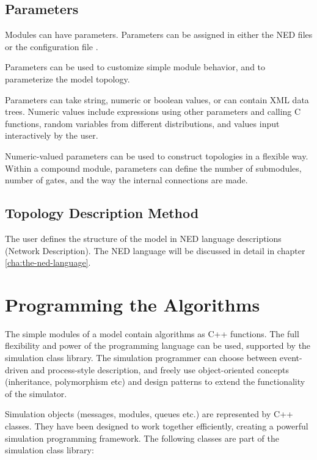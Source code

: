 \subsection{Parameters}

Modules can have parameters. Parameters can be assigned  in either
the NED files or the configuration file .

Parameters can be used to customize simple module behavior,
and to parameterize the model topology.

Parameters can take string, numeric or boolean values, or can
contain XML data trees. Numeric values include expressions using
other parameters and calling C functions, random variables from
different distributions, and values input interactively by the user.

Numeric-valued parameters can be used to construct topologies in a
flexible way. Within a compound module, parameters can define the
number of submodules, number of gates, and the way the internal
connections are made.


\subsection{Topology Description Method}

The user defines the structure of the model in NED language descriptions
(Network Description). The NED language will be discussed in detail
in chapter \ref{cha:the-ned-language}.


\section{Programming the Algorithms}

The simple modules of a model contain algorithms
as C++ functions.
The full flexibility and power of the programming language can
be used, supported by the {\opp} simulation class library.
The simulation programmer can choose between event-driven and process-style
description, and freely use object-oriented concepts
(inheritance, polymorphism etc) and design patterns to extend the
functionality of the simulator.

Simulation objects (messages, modules, queues etc.) are represented
by C++ classes. They have been designed to work together efficiently,
creating a powerful simulation programming framework.
The following classes are part of the simulation class library:

